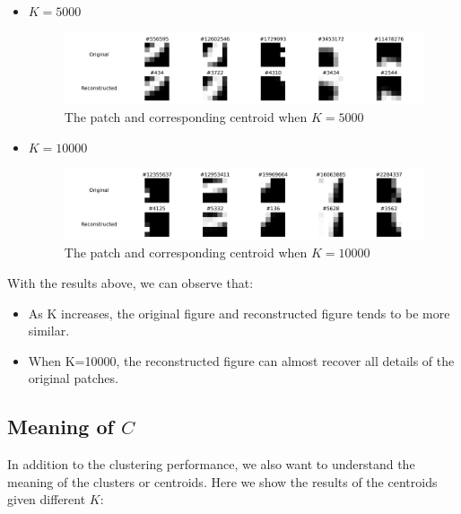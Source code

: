 \documentclass{article}
\begin{document}
\begin{itemize}
            \item $K = 5000$
    \begin{figure}[htbp!]
        \centering
        \includegraphics[width = 0.9 \textwidth]{K-means/Result/Patches/5000-clusters-reconstruction.png}
        \caption{The patch and corresponding centroid when $K = 5000$}
        \label{fig:enter-label}
    \end{figure}

        \item $K = 10000$
    \begin{figure}[htbp!]
        \centering
        \includegraphics[width = 0.9 \textwidth]{K-means/Result/Patches/10000-clusters-reconstruction.png}
        \caption{The patch and corresponding centroid when $K = 10000$}
        \label{fig:enter-label}
    \end{figure}
    
\end{itemize}

With the results above, we can observe that:

\begin{itemize}
    \item As K increases, the original figure and reconstructed figure tends to be more similar.
    \item When K=10000, the reconstructed figure can almost recover all details of the original patches.
\end{itemize}


\subsection{Meaning of $C$}

In addition to the clustering performance, we also want to understand the meaning of the clusters or centroids. Here we show the results of the centroids given different $K$:
\end{document}
